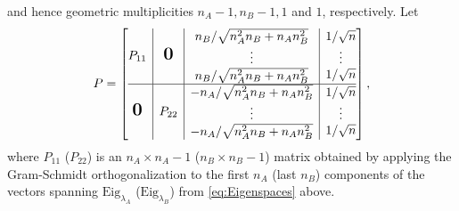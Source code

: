 \documentclass{article}
\theoremstyle{definition}
\theoremstyle{remark}
\newcommand{\bigzero}{\mbox{\normalfont\Large\bfseries 0}}
\begin{document}
and hence geometric multiplicities $n_A -1, n_B -1, 1$ and $1$, respectively. Let
$$
	P = \left[\begin{array}{@{}c|c|c|c@{}}
			P_{11}
			         & \bigzero
			         & \begin{matrix}
				           n_B/\sqrt{n_A^2 n_B + n_A n_B^2} \\
				           \vdots                           \\
				           n_B/\sqrt{n_A^2 n_B + n_A n_B^2}
			           \end{matrix}
			         &
			\begin{matrix}
				1/\sqrt{n} \\
				\vdots     \\
				1/\sqrt{n}
			\end{matrix}                                \\
			\hline
			\bigzero &
			P_{22}
			         & \begin{matrix}
				           -n_A/\sqrt{n_A^2 n_B + n_A n_B^2} \\
				           \vdots                            \\
				           -n_A/\sqrt{n_A^2 n_B + n_A n_B^2}
			           \end{matrix}
			         & \begin{matrix}
				           1/\sqrt{n} \\
				           \vdots     \\
				           1/\sqrt{n}
			           \end{matrix}
		\end{array}\right],
$$
where $P_{11}$ ($P_{22}$) is an $n_A \times n_A -1$ ($n_B \times n_B -1$) matrix obtained by applying the Gram-Schmidt orthogonalization to the first $n_A$ (last $n_B$) components of the vectors spanning $\text{Eig}_{\lambda_A}$ ($\text{Eig}_{\lambda_B}$) from \eqref{eq:Eigenspaces} above.
\end{document}
